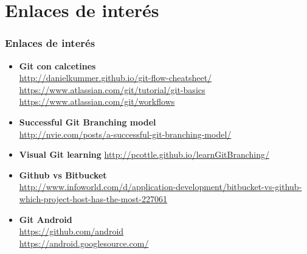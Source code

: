 \section{Enlaces de interés}
\frame
{
\frametitle{Enlaces de interés}
\begin{itemize}
\item \textbf{Git con calcetines}\\ \url{http://danielkummer.github.io/git-flow-cheatsheet/}\\ \url{https://www.atlassian.com/git/tutorial/git-basics}\\
                                    \url{https://www.atlassian.com/git/workflows}
\item \textbf{Successful Git Branching model}\\ \url{http://nvie.com/posts/a-successful-git-branching-model/}
\item \textbf{Visual Git learning} \url{http://pcottle.github.io/learnGitBranching/}
\item \textbf{Github vs Bitbucket}\\ \url{http://www.infoworld.com/d/application-development/bitbucket-vs-github-which-project-host-has-the-most-227061}
\item \textbf{Git Android}\\ \url{https://github.com/android}\\ \url{https://android.googlesource.com/}
\end{itemize}
}